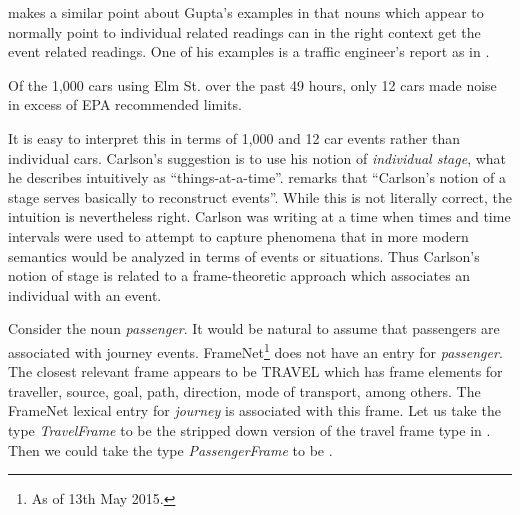 \cite{Carlson1982} makes a similar point about Gupta's examples in
that nouns which appear to normally point to individual related
readings can in the right context get the event related readings.  One
of his examples is a traffic engineer's report as in \nexteg{}.
\begin{ex}
Of the 1,000 cars
using Elm St. over the past 49 hours, only 12 cars made noise in
excess of EPA recommended limits.
\end{ex}
It is easy to interpret this in terms of 1,000 and 12 car events
rather than individual cars.  Carlson's suggestion is to use his
notion of \textit{individual stage}, what he describes intuitively as
``things-at-a-time''.  \cite{Krifka1990} remarks that ``Carlson's
notion of a stage serves basically to reconstruct events''.  While
this is not literally correct, the intuition is nevertheless right.
Carlson was writing at a time when times and time intervals were used
to attempt to capture phenomena that in more modern semantics would be
analyzed in terms of events or situations.  Thus Carlson's notion of
stage is related to a frame-theoretic approach which associates an
individual with an event.  

Consider the noun \textit{passenger}.  It would be natural to assume
that passengers are associated with journey events.  FrameNet\footnote{As of 13th May 2015.}
does not have an entry for \textit{passenger}.  The closest relevant
frame appears to be TRAVEL which has frame elements for traveller,
source, goal, path, direction, mode of transport, among others. The
FrameNet lexical entry for \textit{journey} is associated with this
frame.  Let us take the type \textit{TravelFrame} to be the stripped
down version of the travel frame type in .  Then we could
take the type \textit{PassengerFrame} to be .



\begin{ex} 
\begin{subex} 
 
\item {}
 
\item {}
 
\end{subex} 
   
\end{ex}

